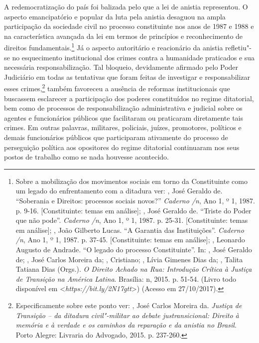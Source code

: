 A redemocratização do país foi balizada pelo que a lei de anistia
representou. O aspecto emancipatório e popular da luta pela anistia
desaguou na ampla participação da sociedade civil no processo
constituinte nos anos de 1987 e 1988 e na característica avançada da lei
em termos de princípios e reconhecimento de direitos
fundamentais.\footnote{Sobre a mobilização dos movimentos sociais em
  torno da Constituinte como um legado do enfrentamento com a ditadura
  ver:  , José Geraldo de. ``Soberania e Direitos: processos
  sociais novos?'' \emph{Caderno /n}, Ano 1, º 1, 1987. p. 9-16.
  {[}Constituinte: temas em análise{]};  , José Geraldo de.
  ``Triste do Poder que não pode''. \emph{Caderno /n}, Ano 1, º 1, 1987. p. 25-31. {[}Constituinte: temas em análise{]}; , João
  Gilberto Lucas. ``A Garantia das Instituições''. \emph{Caderno
  /n}, Ano 1, º 1, 1987. p. 37-45. {[}Constituinte: temas em
  análise{]}; , Leonardo Augusto de Andrade. ``O legado do processo
  Constituinte''. In:  ,
  José Geraldo de;  , José
  Carlos Moreira da; , Cristiano; , Lívia Gimenes Dias da;
  , Talita Tatiana Dias (Orgs.). \emph{O Direito Achado na Rua:
  Introdução Crítica à Justiça de Transição na América Latina}. Brasília:
  n, 2015. p. 51-54. (Livro todo disponível em
  \textless{}\emph{https://bit.ly/2N17gtt}\textgreater{})
  (Acesso em 27/10/2017).} Já o aspecto autoritário e reacionário
da anistia refletiu"-se no esquecimento institucional dos crimes contra a
humanidade praticados e sua necessária responsabilização. Tal bloqueio,
devidamente afirmado pelo Poder Judiciário em todas as tentativas que
foram feitas de investigar e responsabilizar esses crimes,\footnote{Especificamente
  sobre este ponto ver:  , José Carlos Moreira da.
  \emph{Justiça de Transição -- da ditadura civil"-militar ao debate
  justransicional: Direito à memória e à verdade e os caminhos da
  reparação e da anistia no Brasil}. Porto Alegre: Livraria do Advogado,
  2015. p. 237-260.} também favoreceu a ausência de reformas
institucionais que buscassem esclarecer a participação dos poderes
constituídos no regime ditatorial, bem como de processos de
responsabilização administrativa e judicial sobre os agentes e
funcionários públicos que facilitaram ou praticaram diretamente tais
crimes. Em outras palavras, militares, policiais, juízes, promotores,
políticos e demais funcionários públicos que participaram ativamente do
processo de perseguição política aos opositores do regime ditatorial
continuaram nos seus postos de trabalho como se nada houvesse
acontecido.

